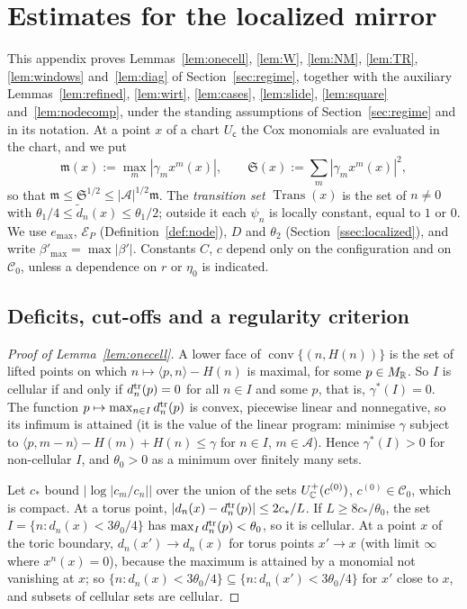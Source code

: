 \section{Estimates for the localized mirror}\label{app:mirror}

This appendix proves Lemmas~\ref{lem:onecell}, \ref{lem:W}, \ref{lem:NM}, \ref{lem:TR}, \ref{lem:windows}
and~\ref{lem:diag} of Section~\ref{sec:regime}, together with the auxiliary Lemmas~\ref{lem:refined}, \ref{lem:wirt}, \ref{lem:cases},
\ref{lem:slide}, \ref{lem:square} and~\ref{lem:nodecomp}, under the standing assumptions of
Section~\ref{sec:regime} and in its notation. At a point $x$ of a chart $U_{\mathsf c}$ the Cox monomials are evaluated in
the chart, and we put
\[
\mathfrak m(x):=\max_m|\gamma_mx^m(x)|,\qquad \mathfrak S(x):=\sum_m|\gamma_mx^m(x)|^2,
\]
so that $\mathfrak m\le\mathfrak S^{1/2}\le|\mathcal A|^{1/2}\mathfrak m$. The \emph{transition set} $\operatorname{Trans}(x)$ is the
set of $n\neq0$ with $\theta_1/4\le\tilde d_n(x)\le\theta_1/2$; outside it each $\psi_n$ is locally constant, equal to $1$
or $0$. We use $e_{\max}$, $\mathcal E_P$ (Definition~\ref{def:node}), $D$ and $\theta_2$ (Section~\ref{ssec:localized}),
and write $\beta'_{\max}=\max|\beta'|$. Constants $C$, $c$ depend only on the configuration and on $\mathscr C_0$, unless a
dependence on $r$ or $\eta_0$ is indicated.

\subsection{Deficits, cut-offs and a regularity criterion}\label{app:deficits}

\begin{proof}[Proof of Lemma~\ref{lem:onecell}]
A lower face of $\operatorname{conv}\{(n,H(n))\}$ is the set of lifted points on which $n\mapsto\langle p,n\rangle-H(n)$ is
maximal, for some $p\in M_\mathbb R$. So $I$ is cellular if and only if $d^{\rm tr}_n(p)=0$ for all $n\in I$ and some $p$, that
is, $\gamma^*(I)=0$. The function $p\mapsto\max_{n\in I}d^{\rm tr}_n(p)$ is convex, piecewise linear and nonnegative, so
its infimum is attained (it is the value of the linear program: minimise $\gamma$ subject to
$\langle p,m-n\rangle-H(m)+H(n)\le\gamma$ for $n\in I$, $m\in\mathcal A$). Hence $\gamma^*(I)>0$ for non-cellular $I$, and
$\theta_0>0$ as a minimum over finitely many sets.

Let $c_*$ bound $|\log|c_m/c_n||$ over the union of the sets $U^+_\mathbb C(c^{(0)})$, $c^{(0)}\in\mathscr C_0$, which is compact.
At a torus point, $|d_n(x)-d^{\rm tr}_n(p)|\le2c_*/L$. If $L\ge8c_*/\theta_0$, the set $I=\{n:d_n(x)<3\theta_0/4\}$ has
$\max_Id^{\rm tr}_n(p)<\theta_0$, so it is cellular. At a point $x$ of the toric boundary, $d_n(x')\to d_n(x)$ for torus
points $x'\to x$ (with limit $\infty$ where $x^n(x)=0$), because the maximum is attained by a monomial not vanishing at
$x$; so $\{n:d_n(x)<3\theta_0/4\}\subseteq\{n:d_n(x')<3\theta_0/4\}$ for $x'$ close to $x$, and subsets of cellular sets
are cellular.
\end{proof}

